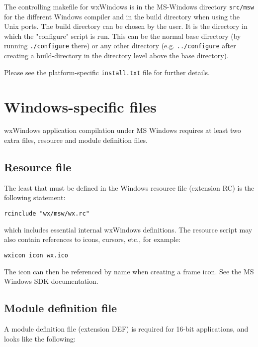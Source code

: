 The controlling makefile for wxWindows is in the MS-Windows
directory {\tt src/msw} for the different Windows compiler and
in the build directory when using the Unix ports. The build
directory can be chosen by the user. It is the directory in
which the "configure" script is run. This can be the normal
base directory (by running {\tt ./configure} there) or any other
directory (e.g. {\tt ../configure} after creating a build-directory
in the directory level above the base directory).

Please see the platform-specific {\tt install.txt} file for further details.

\section{Windows-specific files}

wxWindows application compilation under MS Windows requires at least two
extra files, resource and module definition files.

\subsection{Resource file}\label{resources}

The least that must be defined in the Windows resource file (extension RC)
is the following statement:

\begin{verbatim}
rcinclude "wx/msw/wx.rc"
\end{verbatim}

which includes essential internal wxWindows definitions.  The resource script
may also contain references to icons, cursors, etc., for example:

\begin{verbatim}
wxicon icon wx.ico
\end{verbatim}

The icon can then be referenced by name when creating a frame icon. See
the MS Windows SDK documentation.


\subsection{Module definition file}

A module definition file (extension DEF) is required for 16-bit applications, and
looks like the following:

